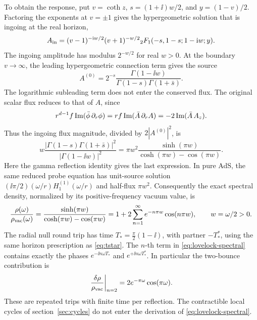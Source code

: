 To obtain the response, put \(v=\coth z\), \(s=(1+\ii)w/2\), and \(y=(1-v)/2\). Factoring the exponents at \(v=\pm1\) gives the hypergeometric solution that is ingoing at the real horizon,
\begin{equation}
 A_{\rm in}=(v-1)^{-\mathrm{i} w/2}(v+1)^{-w/2}
 {}_2F_1(-s,1-s;1-\mathrm{i} w;y).
\end{equation}
The ingoing amplitude has modulus \(2^{-w/2}\) for real \(w>0\). At the boundary \(v\to\infty\), the leading hypergeometric connection term gives the source
\begin{equation}
 A^{(0)}=2^{-s}\frac{\Gamma(1-\ii w)}
                  {\Gamma(1-s)\Gamma(1+\bar s)}.
\end{equation}
The logarithmic subleading term does not enter the conserved flux. The original scalar flux reduces to that of \(A\), since
\begin{equation}
 r^{d-1} f\,{\rm Im}(\bar\phi\,\partial_r\phi)
 =r f\,{\rm Im}(\bar A\,\partial_r A)
 =-2\,{\rm Im}(\bar A\,A_z).
\end{equation}
Thus the ingoing flux magnitude, divided by \(2|A^{(0)}|^2\), is
\begin{equation}
 w\frac{|\Gamma(1-s)\Gamma(1+\bar s)|^2}{|\Gamma(1-\ii w)|^2}
 =\pi w^2\frac{\sinh(\pi w)}{\cosh(\pi w)-\cos(\pi w)}.
\end{equation}
Here the gamma reflection identity gives the last expression. In pure AdS, the same reduced probe equation has unit-source solution \((\ii\pi/2)(\omega/r)H_1^{(1)}(\omega/r)\) and half-flux \(\pi w^2\). Consequently the exact spectral density, normalized by its positive-frequency vacuum value, is
\begin{equation}
 \frac{\rho(\omega)}{\rho_{\rm vac}(\omega)}
 =\frac{\sinh(\pi w)}{\cosh(\pi w)-\cos(\pi w)}
 =1+2\sum_{n=1}^{\infty}e^{-n\pi w}\cos(n\pi w),
 \qquad w=\omega/2>0 .
 \label{eq:lovelock-spectral}
\end{equation}
The radial null round trip has time \(T_*=\frac{\pi}{2}(1-\ii)\), with partner \(-T_*^*\), using the same horizon prescription as \eqref{eq:tstar}. The \(n\)-th term in \eqref{eq:lovelock-spectral} contains exactly the phases \(e^{-\ii n\omega T_*}\) and \(e^{+\ii n\omega T_*^*}\). In particular the two-bounce contribution is
\begin{equation}
 \left.\frac{\delta\rho}{\rho_{\rm vac}}\right|_{n=2}
   =2 e^{-\pi\omega}\cos(\pi\omega).
 \label{eq:lovelock-twobounce}
\end{equation}
These are repeated trips with finite time per reflection. The contractible local cycles of section~\ref{sec:cycles} do not enter the derivation of \eqref{eq:lovelock-spectral}.

